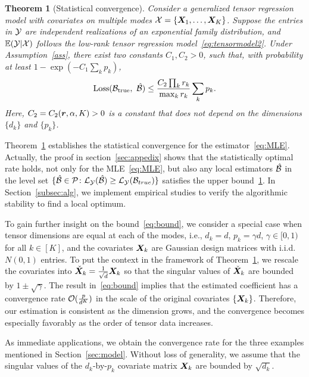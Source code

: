 \documentclass[12pt]{article}
\theoremstyle{plain}
\newtheorem{thm}{Theorem}[section]
\theoremstyle{definition}
\begin{document}
  
\begin{thm}[Statistical convergence]\label{thm:main}
Consider a generalized tensor regression model with covariates on multiple modes $\mathcal{X}=\{\bm X_1,\ldots,\bm X_K\}$. Suppose the entries in $\mathcal{Y}$ are independent realizations of an exponential family distribution, and $\mathbb{E}(\mathcal{Y}|\mathcal{X})$ follows the low-rank tensor regression model~\eqref{eq:tensormodel2}. Under Assumption~\ref{ass}, there exist two constants $C_1, C_2>0$, such that, with probability at least $1-\exp(-C_1\sum_k p_k)$, 
\begin{equation}\label{eq:bound}
\text{Loss}(\mathcal{B}_{\text{true}},\ \hat {\mathcal{B}}) \leq \frac{ C_{2}\prod_kr_k}{\max_k r_k}\sum_k p_k.
\end{equation}
Here, $C_2=C_2(\bm{r},\alpha, K)>0$ is a constant that does not depend on the dimensions $\{d_k\}$ and $\{p_k\}$. 
\end{thm}

Theorem~\ref{thm:main} establishes the statistical convergence for the estimator~\eqref{eq:MLE}. Actually, the proof in section~\ref{sec:appedix} shows that the statistically optimal rate holds, not only for the MLE~\eqref{eq:MLE},  but also any local estimators $\hat {\mathcal{B}}$ in the level set $\{\hat {\mathcal{B}} \in \mathcal{P} \colon \mathcal{L}_{\mathcal{Y}} (\hat {\mathcal{B}}) \geq \mathcal{L}_{\mathcal{Y}} (\mathcal{B}_{true}) \}$ satisfies the upper bound~\ref{thm:main}. In Section~\ref{subsec:alg}, we implement empirical studies to verify the algorithmic stability to find a local optimum.


To gain further insight on the bound~\eqref{eq:bound}, we consider a special case when tensor dimensions are equal at each of the modes, i.e., $d_k=d$, $p_k=\gamma d$, $\gamma\in [0,1)$ for all $k\in[K]$, and the covariates $\bm X_k$ are Gaussian design matrices with i.i.d.\ $N(0,1)$ entries. To put the context in the framework of Theorem~\ref{thm:main}, we rescale the covariates into $\check {\bm X}_k={1\over \sqrt{d}}\bm X_k$ so that the singular values of $\check {\bm X}_k$ are bounded by $1\pm \sqrt{\gamma}$. The result in~\eqref{eq:bound} implies that the estimated coefficient has a convergence rate $\mathcal{O}({p\over d^K})$ in the scale of the original covariates $\{\bm X_k\}$. Therefore, our estimation is consistent as the dimension grows, and the convergence becomes especially favorably as the order of tensor data increases. 

As immediate applications, we obtain the convergence rate for the three examples mentioned in Section~\ref{sec:model}. Without loss of generality, we assume that the singular values of the $d_k$-by-$p_k$ covariate matrix $\bm X_k$ are bounded by $\sqrt{d_k}$. 
\end{document}
